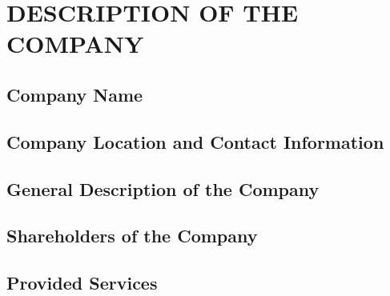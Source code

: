 \chapter{DESCRIPTION OF THE COMPANY}

\section{Company Name}

\section{Company Location and Contact Information}

\section{General Description of the Company}

\section{Shareholders of the Company}

\section{Provided Services}

